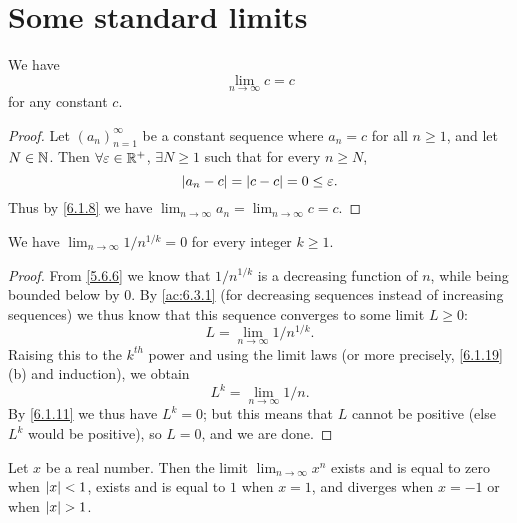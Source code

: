 \section{Some standard limits}\label{sec:6.5}

\begin{ac}\label{ac:6.5.1}
  We have
  \[
    \lim_{n \to \infty} c = c
  \]
  for any constant \(c\).
\end{ac}

\begin{proof}
  Let \((a_n)_{n = 1}^\infty\) be a constant sequence where \(a_n = c\) for all \(n \geq 1\), and let \(N \in \mathbb{N}\).
  Then \(\forall \varepsilon \in \mathbb{R}^+\), \(\exists N \geq 1\) such that for every \(n \geq N\),
  \[
    \left\lvert a_n - c\right\rvert = \left\lvert c - c\right\rvert = 0 \leq \varepsilon.
  \]
  Thus by \cref{6.1.8} we have \(\lim_{n \to \infty} a_n = \lim_{n \to \infty} c = c\).
\end{proof}

\begin{cor}\label{6.5.1}
  We have \(\lim_{n \to \infty} 1 / n^{1 / k} = 0\) for every integer \(k \geq 1\).
\end{cor}

\begin{proof}
  From \cref{5.6.6} we know that \(1 / n^{1 / k}\) is a decreasing function of \(n\), while being bounded below by \(0\).
  By \cref{ac:6.3.1} (for decreasing sequences instead of increasing sequences) we thus know that this sequence converges to some limit \(L \geq 0\):
  \[
    L = \lim_{n \to \infty} 1 / n^{1 / k}.
  \]
  Raising this to the \(k^{th}\) power and using the limit laws (or more precisely, \cref{6.1.19}(b) and induction), we obtain
  \[
    L^k = \lim_{n \to \infty} 1 / n.
  \]
  By \cref{6.1.11} we thus have \(L^k = 0\);
  but this means that \(L\) cannot be positive (else \(L^k\) would be positive), so \(L = 0\), and we are done.
\end{proof}

\begin{lem}\label{6.5.2}
  Let \(x\) be a real number.
  Then the limit \(\lim_{n \to \infty} x^n\) exists and is equal to zero when \(\left\lvert x\right\rvert < 1\), exists and is equal to \(1\) when \(x = 1\), and diverges when \(x = -1\) or when \(\left\lvert x\right\rvert > 1\).
\end{lem}

